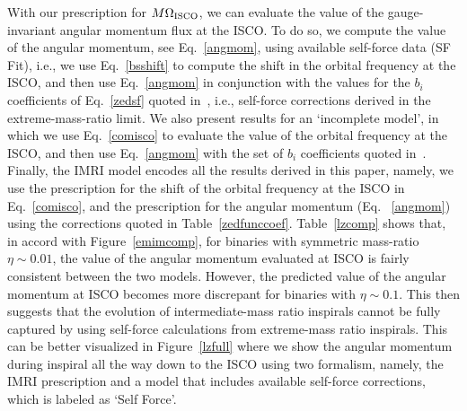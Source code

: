 With our prescription for \(M\Omega_{\rm ISCO}\), we can evaluate the value of the gauge-invariant angular momentum flux at the ISCO. To do so, we compute the value of the angular momentum, see Eq.~\eqref{angmom}, using available self-force data (SF Fit), i.e., we use Eq.~\eqref{bsshift} to compute the shift in the orbital frequency at the ISCO, and then use Eq.~\eqref{angmom} in conjunction with the values for the \(b_i\) coefficients of Eq.~\eqref{zedsf} quoted in~\cite{barus}, i.e., self-force corrections derived in the extreme-mass-ratio limit. We also present results for an `incomplete model', in which we use Eq.~\eqref{comisco} to evaluate the value of the orbital frequency at the ISCO, and then use Eq.~\eqref{angmom} with the set of \(b_i\) coefficients quoted in~\cite{barus}. Finally, the IMRI model encodes all the results derived in this paper, namely, we use the prescription for the shift of the orbital frequency at the ISCO in Eq.~\eqref{comisco}, and the prescription for the angular momentum (Eq.
~\eqref{angmom}) using the corrections quoted in Table~\ref{zedfunccoef}.  Table~\ref{lzcomp} shows that, in accord with Figure~\ref{emimcomp}, for binaries with symmetric mass-ratio \(\eta \sim 0.01\), the value of the angular momentum evaluated at ISCO is fairly consistent between the two models. However,  the predicted value of the angular momentum at ISCO becomes more discrepant for binaries with   \(\eta \sim 0.1\). This then suggests that the evolution of intermediate-mass ratio inspirals cannot be fully captured by using self-force calculations from extreme-mass ratio inspirals. This can be better visualized in Figure~\ref{lzfull} where we show the angular momentum during inspiral all the way down to the ISCO using two formalism, namely, the IMRI prescription and a model that includes available self-force corrections, which is labeled as `Self Force'. 


